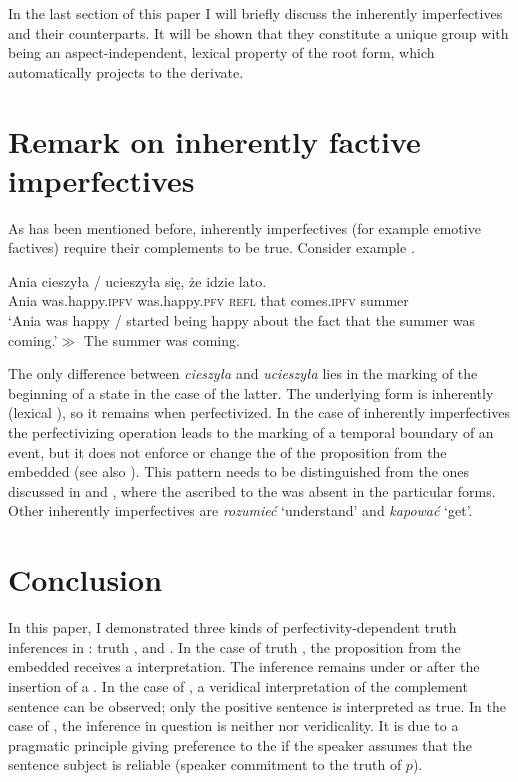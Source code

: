 \documentclass[output=paper,  modfonts,  newtxmath,  hidelinks		  ]{langscibook}
\begin{document}
In the last section of this paper I will briefly discuss the inherently  imperfectives and their  counterparts. It will be shown that they constitute a unique group with  being an aspect-independent, lexical property of the root form, which automatically projects to the  derivate.

\section{Remark on inherently factive imperfectives}

As has been mentioned before, inherently  imperfectives (for example emotive factives) require their complements to be true. Consider example .

\ea\label{21:inh}
\gll Ania cieszyła / ucieszyła się, że idzie lato.\\
Ania was.happy.\textsc{ipfv} {} was.happy.\textsc{pfv} \textsc{refl} that comes.\textsc{ipfv} summer\\
\glt	`Ania was happy / started being happy about the fact that the summer was coming.'\newline$\gg$ The summer was coming.
\z

\noindent The only difference between \textit{cieszyła} and \textit{ucieszyła} lies in the marking of the beginning of a state in the case of the latter. The underlying  form is inherently  (lexical ), so it remains  when perfectivized. In the case of inherently  imperfectives the perfectivizing operation leads to the marking of a temporal boundary of an event, but it does not enforce or change the  of the proposition from the embedded  (see also ). This pattern needs to be distinguished from the ones discussed in  and , where the  ascribed to the  was absent in the particular  forms. Other inherently  imperfectives are \textit{rozumieć} `understand’ and \textit{kapować} `get’.

\section{Conclusion}
In this paper, I demonstrated three kinds of perfectivity-dependent truth inferences in : truth ,  and . In the case of truth , the proposition from the embedded  receives a  interpretation. The inference remains under  or after the insertion of a . In the case of , a veridical interpretation of the complement sentence can be observed; only the positive sentence is interpreted as true. In the case of , the inference in question is neither  nor veridicality. It is due to a pragmatic principle giving preference to the  if the speaker assumes that the sentence subject is reliable (speaker commitment to the truth of $p$).
\end{document}
